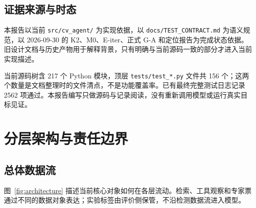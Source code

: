 \documentclass[UTF8,a4paper,zihao=-4,fontset=none]{ctexart}
\newcommand{\code}[1]{{\small\nolinkurl{#1}}}
\begin{document}
\subsection{证据来源与时态}
本报告以当前 \code{src/cv_agent/} 为实现依据，以 \code{docs/TEST_CONTRACT.md} 为语义规范，以 2026-09-30 的 K2、M0、E-iter、正式 G-A 和定位报告为完成状态依据。旧设计文档与历史产物用于解释背景，只有明确与当前源码一致的部分才进入当前实现描述。

当前源码树含 217 个 Python 模块，顶层 \code{tests/test_*.py} 文件共 156 个；这两个数量是文档整理时的文件清点，不是功能覆盖率。已有最终完整测试日志记录 2562 项通过。本报告编写只做源码与记录阅读，没有重新调用模型或运行真实目标见证。

\section{分层架构与责任边界}
\subsection{总体数据流}
图~\ref{fig:architecture} 描述当前核心对象如何在各层流动。检索、工具观察和专家票通过不同的数据对象表达；实验标签由评价侧保管，不沿检测数据流进入模型。
\end{document}
